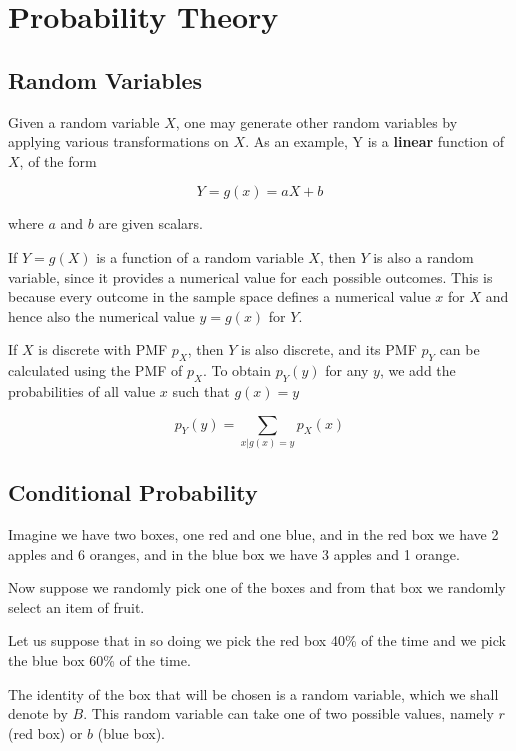 \chapter{Probability Theory}

\section{Random Variables}
Given a random variable $X$, one may generate other random variables by applying various transformations on $X$. As an example, Y is a \textbf{linear} function of $X$, of the form

\begin{equation}
    Y = g(x) = aX + b
\end{equation}

where $a$ and $b$ are given scalars.

If $Y = g(X)$ is a function of a random variable $X$, then $Y$ is also a random variable, since it provides a numerical value for each possible outcomes. This is because every outcome in the sample space defines a numerical value $x$ for $X$ and hence also the numerical value $y = g(x)$ for $Y$.

If $X$ is discrete with PMF $p_X$, then $Y$ is also discrete, and its PMF $p_Y$ can be calculated using the PMF of $p_X$. To obtain $p_Y(y)$ for any $y$, we add the probabilities of all value $x$ such that $g(x) = y$

\begin{equation}
    p_Y(y) = \sum_{x | g(x) = y} p_X(x)
\end{equation}



\section{Conditional Probability}

Imagine we have two boxes, one red and one blue, and in the red box we have 2 apples and 6 oranges, and in the blue box we have 3 apples and 1 orange.

Now suppose we randomly pick one of the boxes and from that box we randomly select an item of fruit.

Let us suppose that in so doing we pick the red box 40\% of the time and we pick the blue box 60\% of the time.

The identity of the box that will be chosen is a random variable, which we shall denote by $B$. This random variable can take one of two possible values, namely $r$ (red box) or $b$ (blue box).

